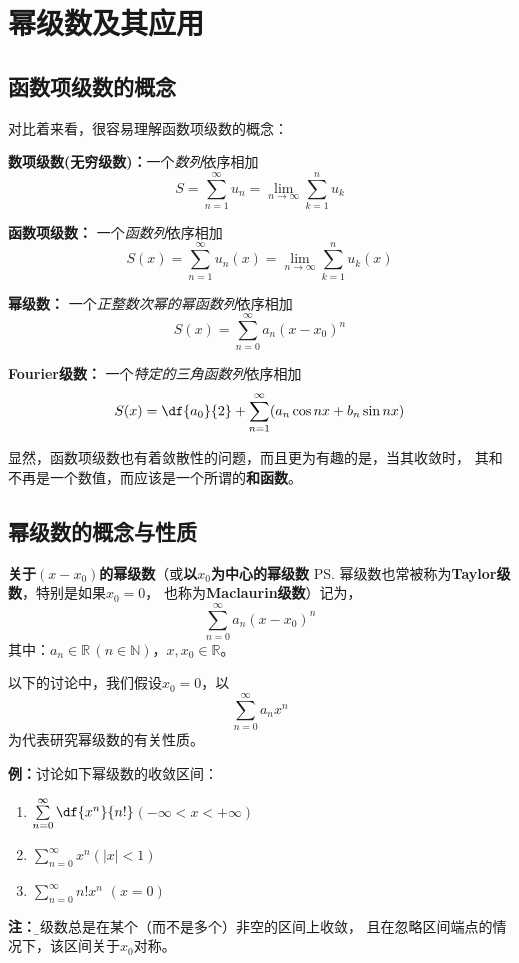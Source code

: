 \section{幂级数及其应用}

\subsection{函数项级数的概念}

对比着来看，很容易理解函数项级数的概念：

{\bf 数项级数(无穷级数)：}一个{\it 数列}依序相加
$$S=\sum\limits_{n=1}^{\infty}u_n
=\lim\limits_{n\to\infty}\sum\limits_{k=1}^nu_k$$ 

{\bf 函数项级数：} 一个{\it 函数列}依序相加 
$$S(x)=\sum\limits_{n=1}^{\infty}u_n(x)
=\lim\limits_{n\to\infty}\sum\limits_{k=1}^nu_k(x)$$

{\bf 幂级数：} 一个{\it 正整数次幂的幂函数列}依序相加
$$S(x)=\sum\limits_{n=0}^{\infty}a_n(x-x_0)^n$$ 

{\bf Fourier级数：} 一个{\it 特定的三角函数列}依序相加
$$S(x)=\df{a_0}{2}+\sum\limits_{n=1}^{\infty}
(a_n\cos nx+b_n\sin nx)$$

显然，函数项级数也有着敛散性的问题，而且更为有趣的是，当其收敛时，
其和不再是一个数值，而应该是一个所谓的{\bf 和函数}。

\subsection{幂级数的概念与性质}

{\bf 关于$(x-x_0)$的幂级数}（或{\bf 以$x_0$为中心的幂级数}
\ps{幂级数也常被称为{\bf Taylor级数}，特别是如果$x_0=0$，
也称为{\bf Maclaurin级数}}）记为，
$${\sum\limits_{n=0}^{\infty}a_n(x-x_0)^n}$$
其中：$a_n\in\mathbb{R}\,(n\in\mathbb{N})$，$x,x_0\in\mathbb{R}$。

以下的讨论中，我们假设$x_0=0$，以
$${\sum\limits_{n=0}^{\infty}a_nx^n}$$
为代表研究幂级数的有关性质。

{\bf 例：}讨论如下幂级数的{\kaishu 收敛区间}：
\begin{enumerate}[(1)]
  \setlength{\itemindent}{1cm}
  \item $\sum\limits_{n=0}^{\infty}\df{x^n}{n!}$\hfill $(-\infty<x<+\infty)$
  \item $\sum\limits_{n=0}^{\infty}x^n$\hfill $(|x|<1)$
  \item $\sum\limits_{n=0}^{\infty}n!x^n$ \hfill $(x=0)$
\end{enumerate}

{\bf 注：}{\b 幂级数总是在某个（而不是多个）非空的区间上收敛，
且在忽略区间端点的情况下，该区间关于$x_0$对称。}

